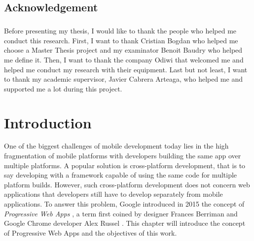 \documentclass{kththesis}
\begin{document}
\section*{Acknowledgement}
\paragraph{}
Before presenting my thesis, I would like to thank the people who helped me conduct this research. First, I want to thank Cristian Bogdan who helped me choose a Master Thesis project and my examinator Benoit Baudry who helped me define it. 
Then, I want to thank the company Odiwi that welcomed me and helped me conduct my research with their equipment. Last but not least, I want to thank my academic supervisor, Javier Cabrera Arteaga, who helped me and supported me a lot during this project. 

\tableofcontents


\mainmatter


\chapter{Introduction}

\indent 

One of the biggest challenges of mobile development today lies in the high fragmentation of mobile platforms \cite{MobileDevChallenges} with developers building the same app over multiple platforms. A popular solution is cross-platform development, that is to say developing with a framework capable of using the same code for multiple platform builds. However, such cross-platform development does not concern web applications that developers still have to develop separately from mobile applications. To answer this problem, Google introduced in 2015 the concept of \textit{Progressive Web Apps} \cite{PWA_intro}, a term first coined by designer Frances Berriman and Google Chrome developer Alex Russel \cite{PWA_blog, PWApossibleUnifer}.
This chapter will introduce the concept of Progressive Web Apps and the objectives of this work.
\end{document}
